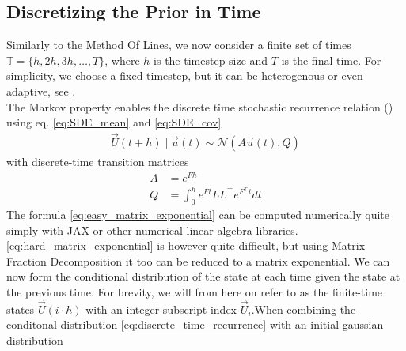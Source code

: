 \subsection*{Discretizing the Prior in Time}
Similarly to the Method Of Lines, we now consider a finite set of times $\mathbb{T} = \{h, 2h, 3h, \dots, T\}$, where $h$ is the timestep size and $T$ is the final time. For simplicity, we choose a fixed timestep, but it can be heterogenous or even adaptive, see \cite{nicoThesis}. 
\\
The Markov property enables the discrete time stochastic recurrence relation (\cite{probnum}) using eq. \ref{eq:SDE_mean} and \ref{eq:SDE_cov}
\begin{align}\label{eq:discrete_time_recurrence}
    \vec{U}(t+h) \;|\; \vec{u}(t) \sim \mathcal{N}(A\vec{u}(t), Q)
\end{align}
with discrete-time transition matrices
\begin{align}
    A &= e^{Fh}\label{eq:easy_matrix_exponential}
    \\
    Q &= \int_0^h e^{Ft}LL^\top e^{F^\top t} dt \label{eq:hard_matrix_exponential}
\end{align}
The formula \ref{eq:easy_matrix_exponential} can be computed numerically quite simply with JAX \cite{jax} or other numerical linear algebra libraries. \ref{eq:hard_matrix_exponential} is however quite difficult, but using Matrix Fraction Decomposition it too can be reduced to a matrix exponential.
We can now form the conditional distribution of the state at each time given the state at the previous time. For brevity, we will from here on refer to as the finite-time states $\vec{U}(i\cdot h)$ with an integer subscript index $\vec{U}_i$.When combining the conditonal distribution \ref{eq:discrete_time_recurrence} with an initial gaussian distribution 
